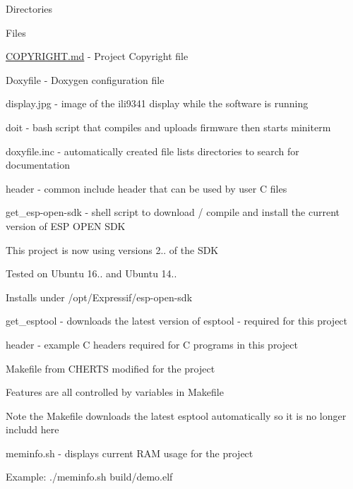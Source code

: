 \begin{DoxyParagraph}{Directories}

\begin{DoxyItemize}
\item Files
\begin{DoxyItemize}
\item \hyperlink{COPYRIGHT_8md}{C\+O\+P\+Y\+R\+I\+G\+H\+T.\+md} -\/ Project Copyright file
\item Doxyfile -\/ Doxygen configuration file
\item display.\+jpg -\/ image of the ili9341 display while the software is running
\item doit -\/ bash script that compiles and uploads firmware then starts miniterm
\item doxyfile.\+inc -\/ automatically created file lists directories to search for documentation
\item header -\/ common include header that can be used by user C files
\item get\+\_\+esp-\/open-\/sdk -\/ shell script to download / compile and install the current version of E\+SP O\+P\+EN S\+DK
\begin{DoxyItemize}
\item This project is now using versions 2.. of the S\+DK
\item Tested on Ubuntu 16.. and Ubuntu 14..
\item Installs under /opt/\+Expressif/esp-\/open-\/sdk
\end{DoxyItemize}
\item get\+\_\+esptool -\/ downloads the latest version of esptool -\/ required for this project
\item header -\/ example C headers required for C programs in this project
\item Makefile from C\+H\+E\+R\+TS modified for the project
\begin{DoxyItemize}
\item Features are all controlled by variables in Makefile
\item Note the Makefile downloads the latest esptool automatically so it is no longer includd here
\end{DoxyItemize}
\item meminfo.\+sh -\/ displays current R\+AM usage for the project
\begin{DoxyItemize}
\item Example\+: ./meminfo.sh build/demo.\+elf
\end{DoxyItemize}

\end{DoxyItemize}
\end{DoxyItemize}
\end{DoxyParagraph}
